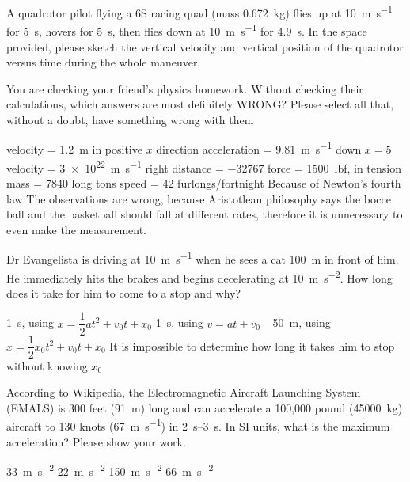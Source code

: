 \documentclass[exam,addpoints, answers]{exam}
\begin{document}
\begin{questions}
\question[5] A quadrotor pilot flying a 6S racing quad (mass \SI{0.672}{\kilo\gram}) flies up at \SI{10}{\meter\per\second} for \SI{5}{\second}, hovers for \SI{5}{\second}, then flies down at \SI{10}{\meter\per\second} for \SI{4.9}{\second}. In the space provided, please sketch the vertical velocity and vertical position of the quadrotor versus time during the whole maneuver. 



\question[5] You are checking your friend's physics homework. Without checking their calculations, which answers are most definitely WRONG? Please select all that, without a doubt, have something wrong with them
\begin{choices}
\CorrectChoice velocity = \SI{1.2}{\meter} in positive $x$ direction
\CorrectChoice acceleration = \SI{9.81}{\meter\per\second} down
\CorrectChoice $x = 5$ 
\CorrectChoice velocity = \SI{3e22}{\meter\per\second} right
\CorrectChoice distance = \num{-32767}
\choice force = \SI{1500}{lbf}, in tension
\choice mass = \num{7840} long tons
\choice speed = \num{42} furlongs/fortnight
\CorrectChoice Because of Newton's fourth law
\CorrectChoice The observations are wrong, because Aristotlean philosophy says the bocce ball and the basketball should fall at different rates, therefore it is unnecessary to even make the measurement. 
\end{choices}




\question[5] Dr Evangelista is driving at \SI{10}{\meter\per\second} when he sees a cat \SI{100}{\meter} in front of him. He immediately hits the brakes and begins decelerating at \SI{10}{\meter\per\second\squared}. How long does it take for him to come to a stop and why? 
\begin{choices}
\choice \SI{1}{\second}, using $x = \dfrac{1}{2} a t^2 + v_0 t + x_0$
\CorrectChoice \SI{1}{\second}, using $v = a t + v_0$
\choice \SI{-50}{\meter}, using $x = \dfrac{1}{2} x_0 t^2 + v_0 t + x_0$
\choice It is impossible to determine how long it takes him to stop without knowing $x_0$
\end{choices}




\question[5]According to Wikipedia, the Electromagnetic Aircraft Launching System (EMALS) is 300 feet (\SI{91}{\meter}) long and can accelerate a 100,000 pound (\SI{45000}{\kilogram}) aircraft to 130 knots (\SI{67}{\meter\per\second}) in \SIrange{2}{3}{\second}. In SI units, what is the maximum acceleration? Please show your work. 
\begin{choices}
\CorrectChoice \SI{33}{\meter\per\second\squared}
\choice \SI{22}{\meter\per\second\squared}
\choice \SI{150}{\meter\per\second\squared}
\choice \SI{66}{\meter\per\second\squared}
\end{choices}





\end{questions}
\end{document}
